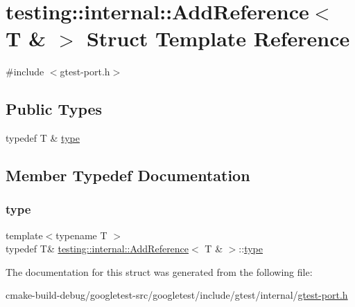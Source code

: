 \hypertarget{structtesting_1_1internal_1_1AddReference_3_01T_01_6_01_4}{}\section{testing\+::internal\+::Add\+Reference$<$ T \& $>$ Struct Template Reference}
\label{structtesting_1_1internal_1_1AddReference_3_01T_01_6_01_4}


{\ttfamily \#include $<$gtest-\/port.\+h$>$}

\subsection*{Public Types}
\begin{DoxyCompactItemize}
\item 
typedef T \& \mbox{\hyperlink{structtesting_1_1internal_1_1AddReference_3_01T_01_6_01_4_a93c064cdcdaced0abd167258425e57af}{type}}
\end{DoxyCompactItemize}


\subsection{Member Typedef Documentation}
\mbox{\label{structtesting_1_1internal_1_1AddReference_3_01T_01_6_01_4_a93c064cdcdaced0abd167258425e57af}} 
\subsubsection{\texorpdfstring{type}{type}}
{\footnotesize\ttfamily template$<$typename T $>$ \\
typedef T\& \mbox{\hyperlink{structtesting_1_1internal_1_1AddReference}{testing\+::internal\+::\+Add\+Reference}}$<$ T \& $>$\+::\mbox{\hyperlink{structtesting_1_1internal_1_1AddReference_3_01T_01_6_01_4_a93c064cdcdaced0abd167258425e57af}{type}}}



The documentation for this struct was generated from the following file\+:\begin{DoxyCompactItemize}
\item 
cmake-\/build-\/debug/googletest-\/src/googletest/include/gtest/internal/\mbox{\hyperlink{gtest-port_8h}{gtest-\/port.\+h}}\end{DoxyCompactItemize}
